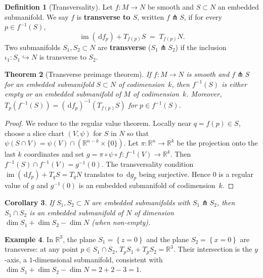 \documentclass[12pt,a4paper,openany]{book}
\newtheorem{theorem}{Theorem}[section]
\newtheorem{corollary}[theorem]{Corollary}
\theoremstyle{definition}
\newtheorem{definition}[theorem]{Definition}
\newtheorem{example}[theorem]{Example}
\theoremstyle{remark}
\newcommand{\R}{\mathbb{R}}
\DeclareMathOperator{\im}{im}
\newcommand{\dd}{\,\mathrm{d}}
\newcommand{\set}[1]{\left\{ #1 \right\}}
\begin{document}
\begin{definition}[Transversality]\label{def:transversality}%
Let $f \colon M \to N$ be smooth and $S \subset N$ an embedded
submanifold.  We say $f$ is \textbf{transverse to $S$}, written
$f \pitchfork S$, if for every $p \in f^{-1}(S)$,
\[
  \im(\dd f_p) + T_{f(p)}S \;=\; T_{f(p)}N.
\]
Two submanifolds $S_1, S_2 \subset N$ are \textbf{transverse}
($S_1 \pitchfork S_2$) if the inclusion $\iota_1 \colon S_1
\hookrightarrow N$ is transverse to $S_2$.
\end{definition}

\begin{theorem}[Transverse preimage theorem]%
\label{thm:transverse-preimage}%
If $f \colon M \to N$ is smooth and $f \pitchfork S$ for an embedded
submanifold $S \subset N$ of codimension~$k$, then $f^{-1}(S)$ is
either empty or an embedded submanifold of $M$ of codimension~$k$.
Moreover, $T_p(f^{-1}(S)) = (\dd f_p)^{-1}(T_{f(p)}S)$ for
$p \in f^{-1}(S)$.
\end{theorem}

\begin{proof}
We reduce to the regular value theorem.  Locally near $q = f(p) \in S$,
choose a slice chart $(V, \psi)$ for $S$ in $N$ so that
$\psi(S \cap V) = \psi(V) \cap (\R^{n-k} \times \{0\})$.  Let
$\pi \colon \R^n \to \R^k$ be the projection onto the last $k$
coordinates and set $g = \pi \circ \psi \circ f \colon f^{-1}(V) \to \R^k$.
Then $f^{-1}(S) \cap f^{-1}(V) = g^{-1}(0)$.  The transversality
condition $\im(\dd f_p) + T_qS = T_qN$ translates to $\dd g_p$ being
surjective.  Hence $0$ is a regular value of $g$ and $g^{-1}(0)$ is an
embedded submanifold of codimension~$k$.
\end{proof}

\begin{corollary}\label{cor:transverse-submanifolds}
If $S_1, S_2 \subset N$ are embedded submanifolds with
$S_1 \pitchfork S_2$, then $S_1 \cap S_2$ is an embedded submanifold
of $N$ of dimension $\dim S_1 + \dim S_2 - \dim N$ (when non-empty).
\end{corollary}

\begin{example}\label{ex:transverse-planes}
In $\R^3$, the plane $S_1 = \set{z = 0}$ and the plane
$S_2 = \set{x = 0}$ are transverse: at any point $p \in S_1 \cap S_2$,
$T_pS_1 + T_pS_2 = \R^3$.  Their intersection is the $y$-axis, a
$1$-dimensional submanifold, consistent with $\dim S_1 + \dim S_2 -
\dim N = 2 + 2 - 3 = 1$.
\end{example}
\end{document}

